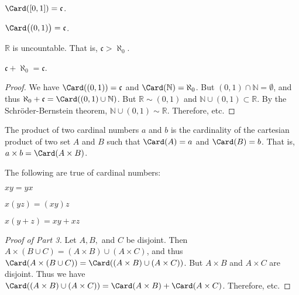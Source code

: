 \documentclass[crop=false,class=article,oneside]{standalone}
\begin{document}
        \begin{theorem*}
            $\Card([0,1])=\mathfrak{c}$.
        \end{theorem*}
        \begin{theorem*}
            $\Card\big((0,1)\big)=\mathfrak{c}$.
        \end{theorem*}
        \begin{theorem*}
            $\mathbb{R}$ is uncountable. That is,
            $\mathfrak{c}>\aleph_{0}$.
        \end{theorem*}
        \begin{theorem*}
            $\mathfrak{c}+\aleph_{0}=\mathfrak{c}$.
        \end{theorem*}
        \begin{proof}
            We have $\Card((0,1))=\mathfrak{c}$ and
            $\Card(\mathbb{N})=\aleph_{0}$. But
            $(0,1)\cap\mathbb{N}=\emptyset$, and thus
            $\aleph_{0}+\mathfrak{c}%
             =\Card((0,1)\cup\mathbb{N})$.
            But $\mathbb{R}\sim(0,1)$ and
            $\mathbb{N}\cup(0,1)\subset\mathbb{R}$.
            By the Schr\"{o}der-Bernstein theorem,
            $\mathbb{N}\cup(0,1)\sim\mathbb{R}$.
            Therefore, etc.
        \end{proof}
        \begin{definition}
            The product of two cardinal numbers $a$ and $b$
            is the cardinality of the cartesian product
            of two set $A$ and $B$ such that
            $\Card(A)=a$ and $\Card(B)=b$. That is,
            ${a}\times{b}=\Card({A}\times{B})$.
        \end{definition}
        \begin{theorem*}
            The following are true of cardinal numbers:
            \begin{enumerate}
                \begin{multicols}{3}
                    \item $xy=yx$
                    \item $x(yz)=(xy)z$
                    \item $x(y+z)=xy+xz$
                \end{multicols}
            \end{enumerate}
        \end{theorem*}
        \begin{proof}[Proof of Part 3]
            Let $A,B,$ and $C$ be disjoint.
            Then
            ${A}\times{({B}\cup{C})}%
             =({A}\times{B})\cup({A}\times{C})$, and thus
            $\Card({A}\times{({B}\cup{C})})%
             =\Card(({A}\times{B})\cup({A}\times{C}))$.
            But ${A}\times{B}$ and ${A}\times{C}$ are disjoint.
            Thus we have
            $\Card(({A}\times{B})\cup({A}\times{C}))%
             =\Card({A}\times{B})+\Card({A}\times{C})$.
            Therefore, etc.
        \end{proof}
\end{document}
